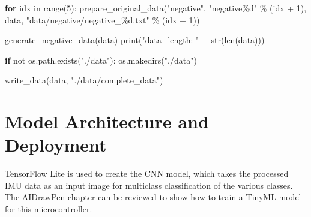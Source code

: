 \documentclass[
  9pt,
  letterpaper,
  abstract,
  titlepage]{scrbook}
\newenvironment{Shaded}{\begin{snugshade}}{\end{snugshade}}
\newcommand{\ControlFlowTok}[1]{\textcolor[rgb]{0.00,0.23,0.31}{\textbf{#1}}}
\newcommand{\DecValTok}[1]{\textcolor[rgb]{0.68,0.00,0.00}{#1}}
\newcommand{\NormalTok}[1]{\textcolor[rgb]{0.00,0.23,0.31}{#1}}
\newcommand{\OperatorTok}[1]{\textcolor[rgb]{0.37,0.37,0.37}{#1}}
\newcommand{\SpecialCharTok}[1]{\textcolor[rgb]{0.37,0.37,0.37}{#1}}
\newcommand{\StringTok}[1]{\textcolor[rgb]{0.13,0.47,0.30}{#1}}
\begin{document}
\begin{Shaded}
\begin{Highlighting}[]
    \ControlFlowTok{for}\NormalTok{ idx in range}\OperatorTok{(}\DecValTok{5}\OperatorTok{):}
\NormalTok{        prepare\_original\_data}\OperatorTok{(}\StringTok{"negative"}\OperatorTok{,} \StringTok{"negative}\SpecialCharTok{\%d}\StringTok{"} \OperatorTok{\%} \OperatorTok{(}\NormalTok{idx }\OperatorTok{+} \DecValTok{1}\OperatorTok{),}\NormalTok{ data}\OperatorTok{,} \StringTok{"data/negative/negative\_}\SpecialCharTok{\%d}\StringTok{.txt"} \OperatorTok{\%} \OperatorTok{(}\NormalTok{idx }\OperatorTok{+} \DecValTok{1}\OperatorTok{))}
    
\NormalTok{    generate\_negative\_data}\OperatorTok{(}\NormalTok{data}\OperatorTok{)}
\NormalTok{    print}\OperatorTok{(}\StringTok{"data\_length: "} \OperatorTok{+}\NormalTok{ str}\OperatorTok{(}\NormalTok{len}\OperatorTok{(}\NormalTok{data}\OperatorTok{)))}

    \ControlFlowTok{if}\NormalTok{ not os}\OperatorTok{.}\NormalTok{path}\OperatorTok{.}\NormalTok{exists}\OperatorTok{(}\StringTok{"./data"}\OperatorTok{):}
\NormalTok{        os}\OperatorTok{.}\NormalTok{makedirs}\OperatorTok{(}\StringTok{"./data"}\OperatorTok{)}
    
\NormalTok{    write\_data}\OperatorTok{(}\NormalTok{data}\OperatorTok{,} \StringTok{"./data/complete\_data"}\OperatorTok{)}
\end{Highlighting}
\end{Shaded}

\section{Model Architecture and
Deployment}\label{model-architecture-and-deployment}

TensorFlow Lite is used to create the CNN model, which takes the
processed IMU data as an input image for multiclass classification of
the various classes. The AIDrawPen chapter can be reviewed to show how
to train a TinyML model for this microcontroller.
\end{document}
